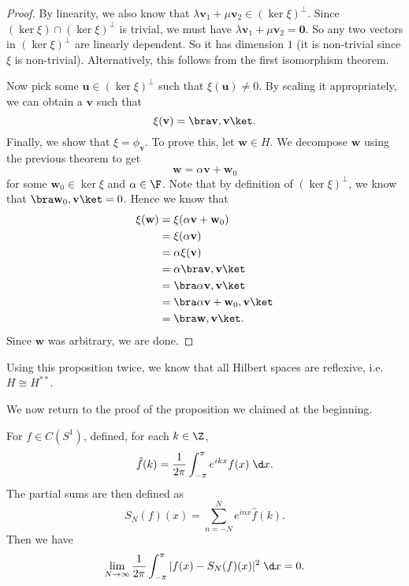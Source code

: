 \documentclass[a4paper]{article}
\begin{document}
\begin{proof}
  By linearity, we also know that $\lambda \mathbf{v}_1 + \mu \mathbf{v}_2 \in (\ker \xi)^\perp$. Since $(\ker \xi) \cap (\ker \xi)^\perp$ is trivial, we must have $\lambda \mathbf{v}_1 + \mu \mathbf{v}_2 = \mathbf{0}$. So any two vectors in $(\ker \xi)^\perp$ are linearly dependent. So it has dimension $1$ (it is non-trivial since $\xi$ is non-trivial). Alternatively, this follows from the first isomorphism theorem.

  Now pick some $\mathbf{u} \in (\ker \xi)^\perp$ such that $\xi(\mathbf{u}) \not= 0$. By scaling it appropriately, we can obtain a $\mathbf{v}$ such that
  \[
    \xi(\mathbf{v}) = \bra \mathbf{v}, \mathbf{v}\ket.
  \]
  Finally, we show that $\xi = \phi_\mathbf{v}$. To prove this, let $\mathbf{w} \in H$. We decompose $\mathbf{w}$ using the previous theorem to get
  \[
    \mathbf{w} = \alpha \mathbf{v} + \mathbf{w}_0
  \]
  for some $\mathbf{w}_0 \in \ker \xi$ and $\alpha \in \F$. Note that by definition of $(\ker \xi)^\perp$, we know that $\bra \mathbf{w}_0, \mathbf{v}\ket = 0$. Hence we know that
  \begin{align*}
    \xi(\mathbf{w}) &= \xi(\alpha \mathbf{v} + \mathbf{w}_0)\\
    &= \xi(\alpha \mathbf{v})\\
    &= \alpha \xi (\mathbf{v})\\
    &= \alpha \bra \mathbf{v}, \mathbf{v}\ket\\
    &= \bra \alpha \mathbf{v}, \mathbf{v}\ket\\
    &= \bra \alpha \mathbf{v} + \mathbf{w}_0, \mathbf{v}\ket\\
    &= \bra \mathbf{w}, \mathbf{v}\ket.
  \end{align*}
  Since $\mathbf{w}$ was arbitrary, we are done.
\end{proof}

Using this proposition twice, we know that all Hilbert spaces are reflexive, i.e.\ $H \cong H^{**}$.

We now return to the proof of the proposition we claimed at the beginning.
\begin{prop}
  For $f \in C(S^1)$, defined, for each $k \in \Z$,
  \[
    \hat{f}(k) = \frac{1}{2\pi} \int_{-\pi}^\pi e^{ikx}f(x)\;\d x.
  \]
  The partial sums are then defined as
  \[
    S_N(f)(x) = \sum_{n = -N}^N e^{inx} \hat{f}(k).
  \]
  Then we have
  \[
    \lim_{N \to \infty} \frac{1}{2\pi}\int_{-\pi}^\pi |f(x) - S_N(f)(x)|^2 \;\d x = 0.
  \]
\end{prop}
\end{document}
